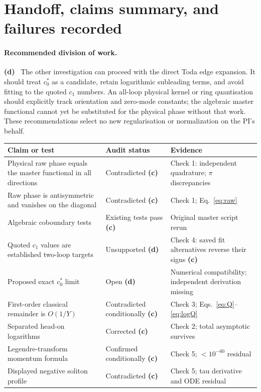\documentclass[11pt,a4paper]{article}
\newcommand{\Lc}{\textsf{\textbf{(c)}}\ }
\newcommand{\Ld}{\textsf{\textbf{(d)}}\ }
\begin{document}
\section{Handoff, claims summary, and failures recorded}
\paragraph{Recommended division of work.}\Ld
The other investigation can proceed with the direct Toda edge expansion.
It should treat $c_0^*$ as a candidate, retain logarithmic subleading terms,
and avoid fitting to the quoted $c_1$ numbers. An all-loop physical kernel
or ring quantisation should explicitly track orientation and zero-mode
constants; the algebraic master functional cannot yet be substituted for
the physical phase without that work. These recommendations select no new
regularisation or normalization on the PI's behalf.

\begin{center}\small
\begin{tabular}{@{}L{6.1cm}L{3.6cm}L{4.5cm}@{}}\toprule
Claim or test & Audit status & Evidence\\\midrule
Physical raw phase equals the master functional in all directions
 & Contradicted \Lc & Check 1: independent quadrature; $\pi$ discrepancies\\
Raw phase is antisymmetric and vanishes on the diagonal
 & Contradicted \Lc & Check 1; Eq.~\eqref{eq:raw}\\
Algebraic coboundary tests
 & Existing tests pass \Lc & Original master script rerun\\
Quoted $c_1$ values are established two-loop targets
 & Unsupported \Ld & Check 4: saved fit alternatives reverse their signs \Lc\\
Proposed exact $c_0^*$ limit
 & Open \Ld & Numerical compatibility; independent derivation missing\\
First-order classical remainder is $O(1/Y)$
 & Contradicted conditionally \Lc & Check 3; Eqs.~\eqref{eq:Q}--\eqref{eq:logQ}\\
Separated head-on logarithms
 & Corrected \Lc & Check 2; total asymptotic survives\\
Legendre-transform momentum formula
 & Confirmed conditionally \Lc & Check 5; $<10^{-60}$ residual\\
Displayed negative soliton profile
 & Contradicted \Lc & Check 5; tau derivative and ODE residual\\\bottomrule
\end{tabular}
\end{center}
\end{document}
